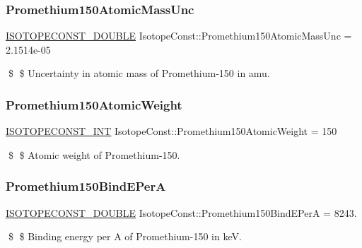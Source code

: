 \subsubsection{\texorpdfstring{Promethium150\+Atomic\+Mass\+Unc}{Promethium150AtomicMassUnc}}
{\footnotesize\ttfamily \mbox{\hyperlink{group___isotope_const-_macros_ga8f45a7272ce02c0b4c65c44636ed719a}{I\+S\+O\+T\+O\+P\+E\+C\+O\+N\+S\+T\+\_\+\+D\+O\+U\+B\+LE}} Isotope\+Const\+::\+Promethium150\+Atomic\+Mass\+Unc = 2.\+1514e-\/05}

\$ \$ Uncertainty in atomic mass of Promethium-\/150 in amu. \mbox{\label{group___isotope_const-_promethium-_pm150_ga73447f98481ac7341eb7dbde6d367546}} 
\subsubsection{\texorpdfstring{Promethium150\+Atomic\+Weight}{Promethium150AtomicWeight}}
{\footnotesize\ttfamily \mbox{\hyperlink{group___isotope_const-_macros_ga5f18360b3e99483a35c32d789e62621c}{I\+S\+O\+T\+O\+P\+E\+C\+O\+N\+S\+T\+\_\+\+I\+NT}} Isotope\+Const\+::\+Promethium150\+Atomic\+Weight = 150}

\$ \$ Atomic weight of Promethium-\/150. \mbox{\label{group___isotope_const-_promethium-_pm150_ga6bd91a5b4c8ee5e5fcd71c9db4fd4462}} 
\subsubsection{\texorpdfstring{Promethium150\+Bind\+E\+PerA}{Promethium150BindEPerA}}
{\footnotesize\ttfamily \mbox{\hyperlink{group___isotope_const-_macros_ga8f45a7272ce02c0b4c65c44636ed719a}{I\+S\+O\+T\+O\+P\+E\+C\+O\+N\+S\+T\+\_\+\+D\+O\+U\+B\+LE}} Isotope\+Const\+::\+Promethium150\+Bind\+E\+PerA = 8243.}

\$ \$ Binding energy per A of Promethium-\/150 in keV. \mbox{\label{group___isotope_const-_promethium-_pm150_ga6f8b24f8b5455aa1fb080f200eaf6562}} 
